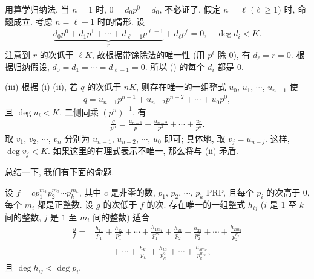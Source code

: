 \begin{pf}
    用算学归纳法. 当 $n = 1$ 时, $0 = d_0 p^0 = d_0$, 不必证了. 假定 $n = \ell$ ($\ell \geq 1$) 时, 命题成立. 考虑 $n = \ell + 1$ 时的情形. 设
    \begin{align*}
        {\underbrace{d_0 p^0 + d_1 p^1 + \cdots + d_{\ell - 1} p^{\ell - 1}}_{r}} + d_\ell p^\ell = 0, \quad \deg d_i < K.
    \end{align*}
    注意到 $r$ 的次低于 $\ell K$, 故根据带馀除法的唯一性 (用 $p^\ell$ 除 $0$), 有 $d_\ell = r = 0$. 根据归纳假设, $d_0 = d_1 = \cdots = d_{\ell - 1} = 0$. 所以 () 的每个 $d_i$ 都是 $0$.

    (iii) 根据 (i) (ii), 若 $q$ 的次低于 $nK$, 则存在唯一的一组整式 $u_0$, $u_1$, $\cdots$, $u_{n-1}$ 使
    \begin{align*}
        q = u_{n-1} p^{n-1} + u_{n-2} p^{n-2} + \cdots + u_0 p^0,
    \end{align*}
    且 $\deg u_i < K$. 二侧同乘 $(p^n)^{-1}$, 有
    \begin{align*}
        \frac{q}{p^n} = \frac{u_{n-1}}{p} + \frac{u_{n-2}}{p^2} + \cdots + \frac{u_0}{p^n}.
    \end{align*}
    取 $v_1$, $v_2$, $\cdots$, $v_n$ 分别为 $u_{n-1}$, $u_{n-2}$, $\cdots$, $u_0$ 即可; 具体地, 取 $v_j = u_{n-j}$. 这样, $\deg v_j < K$. 如果这里的有理式表示不唯一, 那么将与 (ii) 矛盾.
\end{pf}

总结一下, 我们有下面的命题.
\begin{proposition}
    设 $f = c p_1^{m_1} p_2^{m_2} \cdots p_k^{m_k}$, 其中 $c$ 是非零的数, $p_1$, $p_2$, $\cdots$, $p_k$ PRP, 且每个 $p_i$ 的次高于 $0$, 每个 $m_i$ 都是正整数. 设 $g$ 的次低于 $f$ 的次. 存在唯一的一组整式 $h_{ij}$ ($i$ 是 $1$ 至 $k$ 间的整数, $j$ 是 $1$ 至 $m_i$ 间的整数) 适合
    \begin{align*}
        \frac{g}{f}
        = {} & \frac{h_{11}}{p_1} + \frac{h_{12}}{p_1^2} + \cdots + \frac{h_{1 m_1}}{p_1^{m_1}} + \frac{h_{21}}{p_2} + \frac{h_{22}}{p_2^2} + \cdots + \frac{h_{2 m_2}}{p_2^{p_2}} \\
             & \qquad + \cdots + \frac{h_{k1}}{p_k} + \frac{h_{k2}}{p_k^2} + \cdots + \frac{h_{k m_k}}{p_k^{m_k}},
    \end{align*}
    且 $\deg h_{ij} < \deg p_i$.
\end{proposition}


